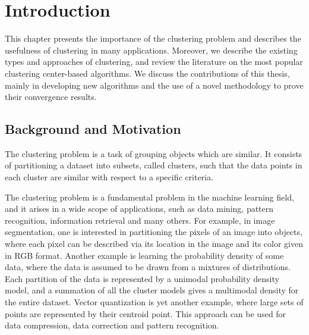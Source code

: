  \chapter{Introduction} \label{intro}

\noindent \noindent \hrulefill

This chapter presents the importance of the clustering problem and describes the usefulness of clustering in many applications. Moreover, we describe the existing types and approaches of clustering, and review the literature on the most popular clustering center-based algorithms. We discuss the contributions of this thesis, mainly in developing new algorithms and the use of a novel methodology to prove their convergence results.

\noindent \noindent \hrulefill

\section{Background and Motivation}

The clustering problem is a task of grouping objects which are similar. It consists of partitioning a dataset into subsets, called clusters, such that the data points in each cluster are similar with respect to a specific criteria. \medskip

The clustering problem is a fundamental problem in the machine learning field, and it arises in a wide scope of applications, such as data mining, pattern recognition, information retrieval and many others. For example, in image segmentation, one is interested in partitioning the pixels of an image into objects, where each pixel can be described via its location in the image and its color given in RGB format. Another example is learning the probability density of some data, where the data is assumed to be drawn from a mixtures of distributions. Each partition of the data is represented by a unimodal probability density model, and a summation of all the cluster models gives a multimodal density for the entire dataset. Vector quantization is yet another example, where large sets of points are represented by their centroid point. This approach can be used for data compression, data correction and pattern recognition.\medskip

